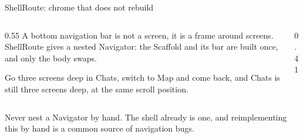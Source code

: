 \documentclass[10pt,aspectratio=169,t]{beamer}
\begin{document}
\begin{frame}[eyebrow=Routing]{ShellRoute: chrome that does not rebuild}
  \begin{columns}[T]
    \begin{column}{0.55\textwidth}
      A bottom navigation bar is not a screen, it is a frame around screens. ShellRoute gives a nested Navigator: the Scaffold and its bar are built once, and only the body swaps.


      Go three screens deep in Chats, switch to Map and come back, and Chats is still three screens deep, at the same scroll position.
    \end{column}
    \begin{column}{0.41\textwidth}
      \begin{grid}[3]
      \end{grid}
      \vskip 2mm
    \end{column}
  \end{columns}
  \begin{takeaway}{Never nest a Navigator by hand.}
    The shell already is one, and reimplementing this by hand is a common source of navigation bugs.
  \end{takeaway}
\end{frame}
\end{document}
